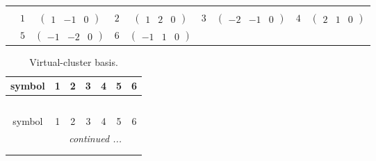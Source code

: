 \documentclass[fleqn,10pt,landscape]{article}
\begin{document}
\begin{itemize}
{\begin{center}
\begin{longtable}{ccccccccc}
 \hline \hline
\multicolumn{8}{r}{} \\ \endlastfoot

 & $ 1 $ & $ \begin{pmatrix} 1 & -1 & 0 \end{pmatrix} $ & $ 2 $ & $ \begin{pmatrix} 1 & 2 & 0 \end{pmatrix} $ & $ 3 $ & $ \begin{pmatrix} -2 & -1 & 0 \end{pmatrix} $ & $ 4 $ & $ \begin{pmatrix} 2 & 1 & 0 \end{pmatrix} $ \\
& $ 5 $ & $ \begin{pmatrix} -1 & -2 & 0 \end{pmatrix} $ & $ 6 $ & $ \begin{pmatrix} -1 & 1 & 0 \end{pmatrix} $ & $  $ & $  $ & $  $ & $  $ \\
\end{longtable}
\end{center}
\begin{center}
\renewcommand{\arraystretch}{1.7}
\begin{longtable}{ccccccc}
\caption{Virtual-cluster basis.}
 \\
 \hline \hline
symbol & 1 & 2 & 3 & 4 & 5 & 6 \\ \hline \endfirsthead

\multicolumn{6}{l}{\tablename\ \thetable{}} \\
 \hline \hline
symbol & 1 & 2 & 3 & 4 & 5 & 6 \\ \hline \endhead

 \hline \hline
\multicolumn{6}{r}{\footnotesize\it continued ...} \\ \endfoot

 \hline \hline
\multicolumn{6}{r}{} \\ \endlastfoot


\end{longtable}
\end{center}}
\end{itemize}
\end{document}
